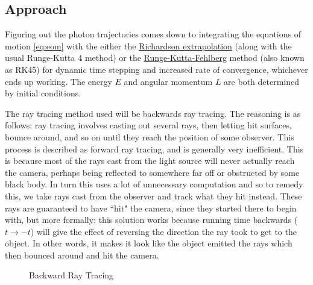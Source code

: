 \documentclass{article}
\begin{document}
\subsection*{Approach}
Figuring out the photon trajectories comes down to integrating the equations of motion \ref{eq:eom} with the either the \hyperlink{https://personal.math.ubc.ca/~feldman/m256/richard.pdf}{Richardson extrapolation} (along with the usual Runge-Kutta 4 method) or the \hyperlink{https://en.wikipedia.org/wiki/Runge-Kutta-Fehlberg_method}{Runge-Kutta-Fehlberg} method (also known as RK45) for dynamic time stepping and increased rate of convergence, whichever ends up working. The energy \(E\) and angular momentum \(L\) are both determined by initial conditions. 

The ray tracing method used will be backwards ray tracing. The reasoning is as follows: ray tracing involves casting out several rays, then letting hit surfaces, bounce around, and so on until they reach the position of some observer. This process is described as forward ray tracing, and is generally very inefficient. This is because most of the rays cast from the light source will never actually reach the camera, perhaps being reflected to somewhere far off or obstructed by some black body. In turn this uses a lot of unnecessary computation and so to remedy this, we take rays cast from the observer and track what they hit instead. These rays are guaranteed to have ``hit" the camera, since they started there to begin with, but more formally: this solution works because running time backwards (\(t\to -t\)) will give the effect of reversing the direction the ray took to get to the object. In other words, it makes it look like the object emitted the rays which then bounced around and hit the camera.

\begin{figure}[H]
	\centering
	\caption{Backward Ray Tracing}
\end{figure}
\end{document}
